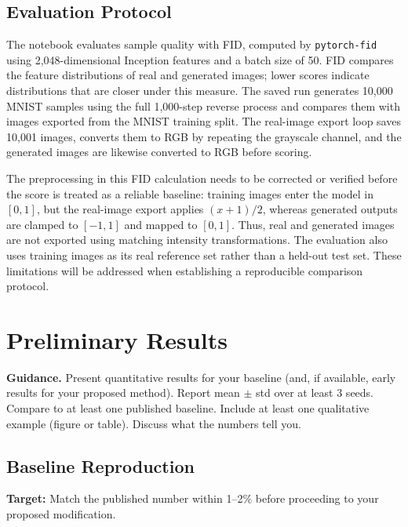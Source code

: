 \documentclass[11pt, letterpaper]{article}
\begin{document}
\subsection{Evaluation Protocol}

The notebook evaluates sample quality with FID, computed by \texttt{pytorch-fid} using 2,048-dimensional Inception features and a batch size of 50. FID compares the feature distributions of real and generated images; lower scores indicate distributions that are closer under this measure. The saved run generates 10,000 MNIST samples using the full 1,000-step reverse process and compares them with images exported from the MNIST training split. The real-image export loop saves 10,001 images, converts them to RGB by repeating the grayscale channel, and the generated images are likewise converted to RGB before scoring. 

The preprocessing in this FID calculation needs to be corrected or verified before the score is treated as a reliable baseline: training images enter the model in $[0,1]$, but the real-image export applies $(x+1)/2$, whereas generated outputs are clamped to $[-1,1]$ and mapped to $[0,1]$. Thus, real and generated images are not exported using matching intensity transformations. The evaluation also uses training images as its real reference set rather than a held-out test set. These limitations will be addressed when establishing a reproducible comparison protocol.


\section{Preliminary Results}

\begin{guidancebox}
\textbf{Guidance.} Present quantitative results for your baseline (and, if
available, early results for your proposed method). Report mean $\pm$ std over
at least 3 seeds. Compare to at least one published baseline. Include at least
one qualitative example (figure or table). Discuss what the numbers tell you.
\end{guidancebox}

\subsection{Baseline Reproduction}

\begin{notebox}
\textbf{Target:} Match the published number within 1--2\% before proceeding
to your proposed modification.
\end{notebox}
\end{document}
